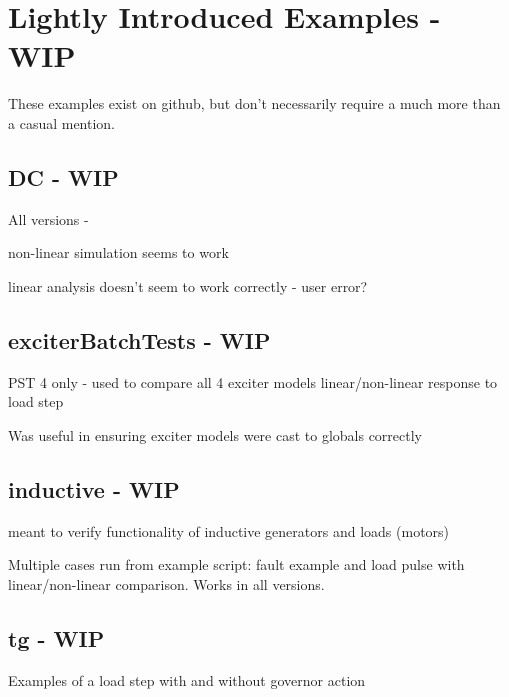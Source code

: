 \pagebreak


\pagebreak
\section{Lightly Introduced Examples - WIP}
These examples exist on github, but don't necessarily require a much more than a casual mention.
\subsection{DC - WIP}
All versions - 

non-linear simulation seems to work

linear analysis doesn't seem to work correctly - user error?

\subsection{exciterBatchTests - WIP}
PST 4 only - used to compare all 4 exciter models linear/non-linear response to load step

Was useful in ensuring exciter models were cast to globals correctly

\subsection{inductive - WIP}
meant to verify functionality of inductive generators and loads (motors)

Multiple cases run from example script: fault example and load pulse with linear/non-linear comparison.
Works in all versions.

\subsection{tg - WIP}
Examples of a load step with and without governor action

